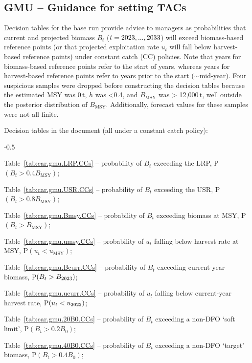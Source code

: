 \documentclass[11pt]{book}
\newcommand{\Bmsy}{B_\text{MSY}}
\newcommand{\umsy}{u_\text{MSY}}
\begin{document}
\clearpage \newpage

\subsection{GMU -- Guidance for setting TACs}

Decision tables for the base run provide advice to managers as probabilities that current and projected biomass $B_t$ ($t = 2023, ..., 2033$) will exceed biomass-based reference points (or that projected exploitation rate $u_t$ will fall below harvest-based reference points) under constant catch (CC) policies. Note that years for biomass-based reference points refer to the start of years, whereas years for harvest-based reference points refer to years prior to the start ($\sim$mid-year).
Four suspicious samples were dropped before constructing the decision tables because the estimated MSY was 0\,t, $h$ was <0.4, and $\Bmsy$ was > 12,000\,t, well outside the posterior distribution of $\Bmsy$.
Additionally, forecast values for these samples were not all finite.

Decision tables in the document (all under a constant catch policy):
\begin{itemize_csas}{-0.5}{}
\item Table~\ref{tab:car.gmu.LRP.CCs} -- probability of $B_t$ exceeding the LRP, P$(B_t > 0.4 \Bmsy)$; %
\item Table~\ref{tab:car.gmu.USR.CCs} -- probability of $B_t$ exceeding the USR, P$(B_t > 0.8 \Bmsy)$; %
\item Table~\ref{tab:car.gmu.Bmsy.CCs} -- probability of $B_t$ exceeding biomass at MSY, P$(B_t > \Bmsy)$; %
\item Table~\ref{tab:car.gmu.umsy.CCs} -- probability of $u_t$ falling below harvest rate at MSY, P$(u_t < \umsy)$; %
\item Table~\ref{tab:car.gmu.Bcurr.CCs} -- probability of $B_t$ exceeding current-year biomass, P$(B_t > B_{2023})$; %
\item Table~\ref{tab:car.gmu.ucurr.CCs} -- probability of $u_t$ falling below current-year harvest rate, P$(u_t < u_{2022})$; %
\item Table~\ref{tab:car.gmu.20B0.CCs} -- probability of $B_t$ exceeding a non-DFO `soft limit', P$(B_t > 0.2 B_0)$; %
\item Table~\ref{tab:car.gmu.40B0.CCs} -- probability of $B_t$ exceeding a non-DFO `target' biomass, P$(B_t > 0.4 B_0)$; %
\end{itemize_csas}
\end{document}
